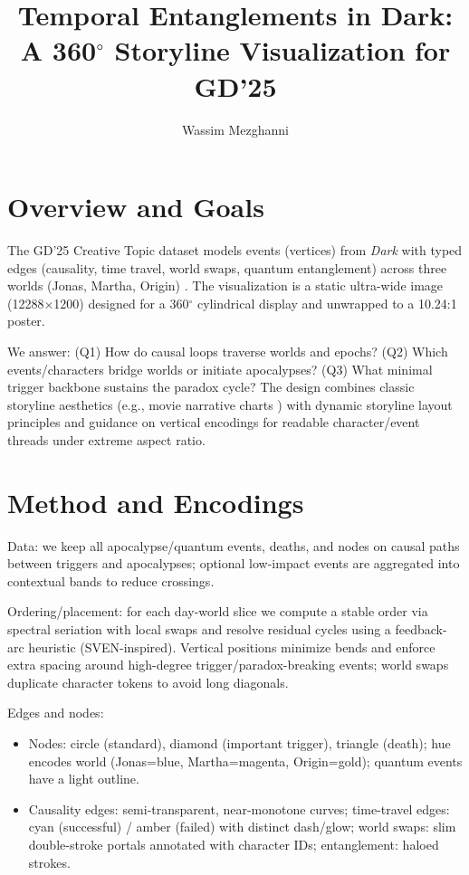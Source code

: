 \documentclass[a4paper,UKenglish,cleveref, autoref, thm-restate]{lipics-v2021}
\title{Temporal Entanglements in Dark: A 360$^\circ$ Storyline Visualization for GD'25}
\author{Wassim Mezghanni}{Technical University of Munich, Germany}{email}{[orcid]}{}
\begin{document}
\maketitle


\section{Overview and Goals}\label{sec:overview}
The GD'25 Creative Topic dataset models events (vertices) from \emph{Dark} with typed edges (causality, time travel, world swaps, quantum entanglement) across three worlds (Jonas, Martha, Origin) \cite{DarkGraphReddit}. The visualization is a static ultra-wide image (12288$\times$1200) designed for a 360$^\circ$ cylindrical display and unwrapped to a 10.24:1 poster.

We answer: (Q1) How do causal loops traverse worlds and epochs? (Q2) Which events/characters bridge worlds or initiate apocalypses? (Q3) What minimal trigger backbone sustains the paradox cycle? The design combines classic storyline aesthetics (e.g., movie narrative charts \cite{XKCDMovieNarrative}) with dynamic storyline layout principles and guidance on vertical encodings \cite{TanahashiMa2012Storyline,Arendt2017YMatters} for readable character/event threads under extreme aspect ratio.

\section{Method and Encodings}\label{sec:method}
Data: we keep all apocalypse/quantum events, deaths, and nodes on causal paths between triggers and apocalypses; optional low-impact events are aggregated into contextual bands to reduce crossings.

Ordering/placement: for each day-world slice we compute a stable order via spectral seriation with local swaps and resolve residual cycles using a feedback-arc heuristic (SVEN-inspired). Vertical positions minimize bends and enforce extra spacing around high-degree trigger/paradox-breaking events; world swaps duplicate character tokens to avoid long diagonals.

Edges and nodes:
\begin{itemize}
  \item Nodes: circle (standard), diamond (important trigger), triangle (death); hue encodes world (Jonas=blue, Martha=magenta, Origin=gold); quantum events have a light outline.
  \item Causality edges: semi-transparent, near-monotone curves; time-travel edges: cyan (successful) / amber (failed) with distinct dash/glow; world swaps: slim double-stroke portals annotated with character IDs; entanglement: haloed strokes.
\end{itemize}
\end{document}
